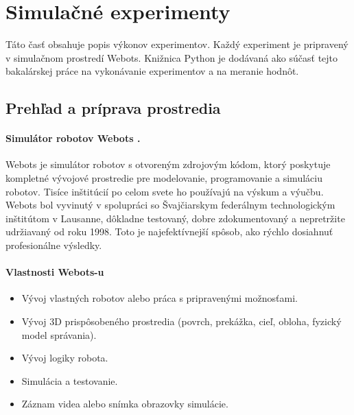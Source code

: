 \section{Simulačné experimenty}
Táto časť obsahuje popis výkonov experimentov. Každý experiment je pripravený v simulačnom prostredí Webots. Knižnica Python je dodávaná ako súčasť tejto bakalárskej práce na vykonávanie experimentov a na meranie hodnôt.
\subsection{Prehľad a príprava prostredia}
\paragraph{Simulátor robotov Webots \citep{webots}.}
Webots je simulátor robotov s otvoreným zdrojovým kódom, ktorý poskytuje kompletné vývojové prostredie pre modelovanie, programovanie a simuláciu robotov. Tisíce inštitúcií po celom svete ho používajú na výskum a výučbu. Webots bol vyvinutý v spolupráci so Švajčiarskym federálnym technologickým inštitútom v Lausanne, dôkladne testovaný, dobre zdokumentovaný a nepretržite udržiavaný od roku 1998. Toto je najefektívnejší spôsob, ako rýchlo dosiahnuť profesionálne výsledky.
\paragraph{Vlastnosti Webots-u}
\begin{itemize}
    \item Vývoj vlastných robotov alebo práca s pripravenými možnosťami.
    \item Vývoj 3D prispôsobeného prostredia (povrch, prekážka, cieľ, obloha, fyzický model správania).
    \item Vývoj logiky robota.
    \item Simulácia a testovanie.
    \item Záznam videa alebo snímka obrazovky simulácie. 
\end{itemize}

